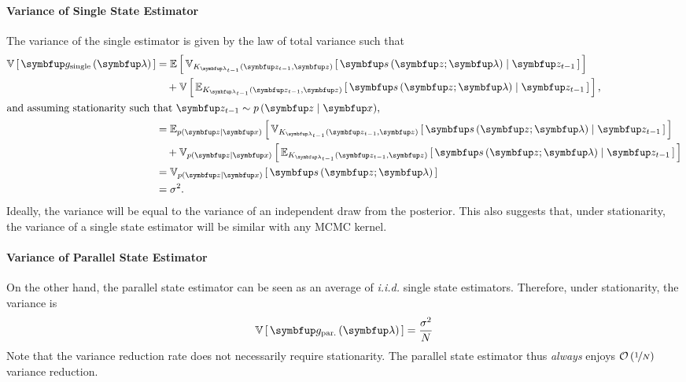 \paragraph{Variance of Single State Estimator}
The variance of the single estimator is given by the law of total variance such that
\vspace{-0.05in}
\begin{align}
  \V{\vg_{\text{single}}\left(\vlambda\right)} 
  &= \E{ \Vsub{K_{\vlambda_{t-1}}\left(\vz_{t-1}, \vz\right)}{ \vs\left(\vz; \vlambda\right) \mid \vz_{t-1} }} \nonumber \\
  &\quad + \V{ \Esub{K_{\vlambda_{t-1}}\left(\vz_{t-1}, \vz\right)}{ \vs\left(\vz; \vlambda\right) \mid \vz_{t-1} } }, \nonumber \\
  \intertext{and assuming stationarity such that \(\vz_{t-1} \sim p\left(\vz \mid \vx\right)\),}
  &= \Esub{p\left(\vz\mid\vx \right)}{ \Vsub{K_{\vlambda_{t-1}}\left(\vz_{t-1}, \vz\right)}{ \vs\left(\vz; \vlambda\right) \mid \vz_{t-1} }} \nonumber\\
  &\quad + \Vsub{p\left(\vz\mid\vx \right)}{ \Esub{K_{\vlambda_{t-1}}\left(\vz_{t-1}, \vz\right)}{ \vs\left(\vz; \vlambda\right) \mid \vz_{t-1} } } \nonumber \\
  &= \Vsub{p\left(\vz\mid\vx \right)}{\vs\left(\vz; \vlambda\right)} \nonumber \\
  &= \sigma^2.\nonumber
\end{align}
Ideally, the variance will be equal to the variance of an independent draw from the posterior.
This also suggests that, under stationarity, the variance of a single state estimator will be similar with any MCMC kernel.

\vspace{-0.05in}
\paragraph{Variance of Parallel State Estimator}
On the other hand, the parallel state estimator can be seen as an average of \textit{i.i.d.} single state estimators.
Therefore, under stationarity, the variance is
\vspace{-0.05in}
\begin{align*}
  \V{\vg_{\text{par.}}\left(\vlambda\right)} = \frac{\sigma^2}{N}
\end{align*}
\vspace{-0.05in}
Note that the variance reduction rate does not necessarily require stationarity.
The parallel state estimator thus \textit{always} enjoys \(\mathcal{O}\left(\nicefrac{1}{N}\right)\) variance reduction.

